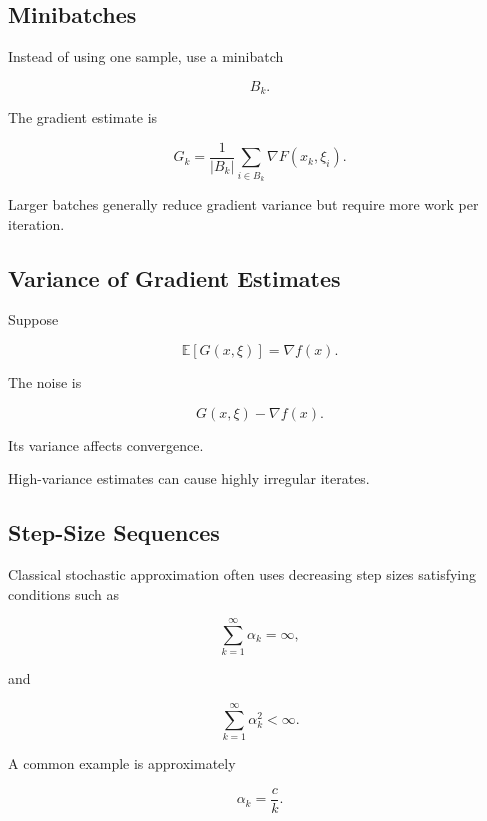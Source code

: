 \subsection{Minibatches}
\label{subsec:minibatches-stochastic-optimization}

Instead of using one sample, use a minibatch

\[
B_k.
\]

The gradient estimate is

\[
\boxed{
G_k
=
\frac1{|B_k|}
\sum_{i\in B_k}
\nabla
F
(
x_k,\xi_i
).
}
\]

Larger batches generally reduce gradient variance but require more work per
iteration.

\subsection{Variance of Gradient Estimates}
\label{subsec:gradient-estimate-variance}

Suppose

\[
\mathbb{E}
[
G(x,\xi)
]
=
\nabla f(x).
\]

The noise is

\[
\boxed{
G(x,\xi)
-
\nabla f(x).
}
\]

Its variance affects convergence.

High-variance estimates can cause highly irregular iterates.

\subsection{Step-Size Sequences}
\label{subsec:stochastic-step-size-sequences}

Classical stochastic approximation often uses decreasing step sizes
satisfying conditions such as

\[
\boxed{
\sum_{k=1}^{\infty}
\alpha_k
=
\infty,
}
\]

and

\[
\boxed{
\sum_{k=1}^{\infty}
\alpha_k^2
<
\infty.
}
\]

A common example is approximately

\[
\boxed{
\alpha_k
=
\frac{c}{k}.
}
\]

